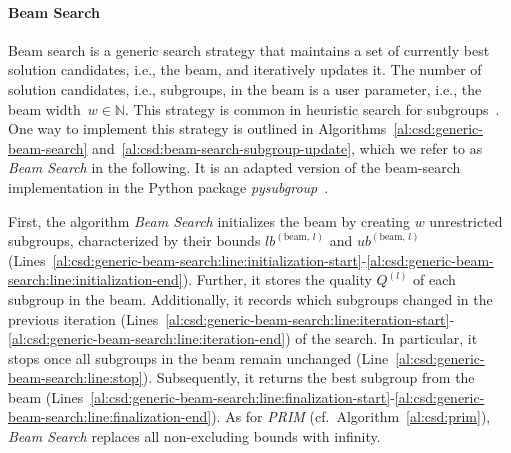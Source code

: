 \documentclass{article}
\theoremstyle{definition}
\begin{document}
\paragraph{Beam Search}

Beam search is a generic search strategy that maintains a set of currently best solution candidates, i.e., the beam, and iteratively updates it.
The number of solution candidates, i.e., subgroups, in the beam is a user parameter, i.e., the beam width~$w \in \mathbb{N}$.
This strategy is common in heuristic search for subgroups~\cite{atzmueller2005exploiting}.
One way to implement this strategy is outlined in Algorithms~\ref{al:csd:generic-beam-search} and~\ref{al:csd:beam-search-subgroup-update}, which we refer to as \emph{Beam Search} in the following.
It is an adapted version of the beam-search implementation in the Python package \emph{pysubgroup}~\cite{lemmerich2019pysubgroup}.

First, the algorithm \emph{Beam Search} initializes the beam by creating $w$ unrestricted subgroups, characterized by their bounds $\mathit{lb}^{(\text{beam, } l)}$ and $\mathit{ub}^{(\text{beam, } l)}$ (Lines~\ref{al:csd:generic-beam-search:line:initialization-start}-\ref{al:csd:generic-beam-search:line:initialization-end}).
Further, it stores the quality $Q^{(l)}$ of each subgroup in the beam.
Additionally, it records which subgroups changed in the previous iteration (Lines~\ref{al:csd:generic-beam-search:line:iteration-start}-\ref{al:csd:generic-beam-search:line:iteration-end}) of the search.
In particular, it stops once all subgroups in the beam remain unchanged (Line~\ref{al:csd:generic-beam-search:line:stop}).
Subsequently, it returns the best subgroup from the beam (Lines~\ref{al:csd:generic-beam-search:line:finalization-start}-\ref{al:csd:generic-beam-search:line:finalization-end}).
As for \emph{PRIM} (cf.~Algorithm~\ref{al:csd:prim}), \emph{Beam Search} replaces all non-excluding bounds with infinity.
\end{document}
